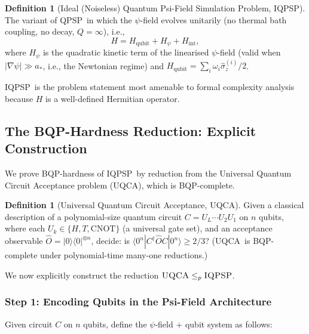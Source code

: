 \documentclass[11pt]{article}
\theoremstyle{definition}
\newtheorem{definition}[theorem]{Definition}
\theoremstyle{remark}
\newcommand{\astar}{a_*}
\newcommand{\QPSP}{\textsc{QPSP}}
\newcommand{\IQPSP}{\textsc{IQPSP}}
\begin{document}
\begin{definition}[Ideal (Noiseless) Quantum Psi-Field Simulation Problem,
\IQPSP]
\label{def:iqpsp}
The variant of \QPSP\ in which the $\psi$-field evolves unitarily
(no thermal bath coupling, no decay, $Q = \infty$), i.e.,
\begin{equation}
H = H_{\mathrm{qubit}} + H_{\psi} + H_{\mathrm{int}},
\label{eq:htotal}
\end{equation}
where $H_{\psi}$ is the quadratic kinetic term of the linearised
$\psi$-field (valid when $|\nabla\psi| \gg \astar$, i.e., the Newtonian
regime) and $H_{\mathrm{qubit}} = \sum_i \omega_i \hat{\sigma}_z^{(i)}/2$.

\IQPSP\ is the problem statement most amenable to formal complexity
analysis because $H$ is a well-defined Hermitian operator.
\end{definition}

\subsection{The BQP-Hardness Reduction: Explicit Construction}
\label{sec:bqp_reduction}

We prove BQP-hardness of \IQPSP\ by reduction from the Universal
Quantum Circuit Acceptance problem (\textsc{UQCA}), which is
BQP-complete.

\begin{definition}[Universal Quantum Circuit Acceptance, \textsc{UQCA}]
Given a classical description of a polynomial-size quantum circuit
$C = U_L \cdots U_2 U_1$ on $n$ qubits, where each $U_k \in \{H, T, \mathrm{CNOT}\}$
(a universal gate set), and an acceptance observable $\hat{O} = |0\rangle\langle 0|^{\otimes n}$,
decide: is $\langle 0^n | C^\dagger \hat{O} C | 0^n \rangle \geq 2/3$?
(\textsc{UQCA}\ is BQP-complete under polynomial-time many-one reductions.)
\end{definition}

We now explicitly construct the reduction $\textsc{UQCA} \leq_p \IQPSP$.

\subsubsection{Step 1: Encoding Qubits in the Psi-Field Architecture}

Given circuit $C$ on $n$ qubits, define the $\psi$-field + qubit system
as follows:
\end{document}
